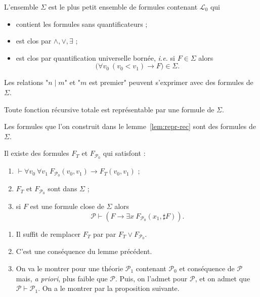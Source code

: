 \documentclass[./main]{subfiles}
\begin{document}
 \begin{defn}
   L'ensemble $\Sigma$ est le plus petit ensemble de formules contenant $\mathcal{L}_0$ qui 
   \begin{itemize}
     \item contient les formules sans quantificateurs ;
     \item est clos par $\land, \lor, \exists$ ;
     \item est clos par quantification universelle bornée, \textit{i.e.} si $F \in \Sigma$  alors \[
       \big(\forall v_0 \: (v_0 < v_1) \to F\big) \in \Sigma
       .\]
   \end{itemize}
 \end{defn}

 \begin{exm}
   Les relations "$n  \mid m$" et "$m$ est premier" peuvent s'exprimer avec des formules de $\Sigma$.
 \end{exm}

 \begin{lem}
   Toute fonction récursive totale est représentable par une formule de $\Sigma$.
 \end{lem}
 \begin{prv}
   Les formules que l'on construit dans le lemme~\ref{lem:repr-rec} sont des formules de $\Sigma$.
 \end{prv}

 \begin{lem}
   Il existe des formules $F_T$ et $F_{\mathcal{P}_0}$ qui satisfont :
   \begin{enumerate}
     \item $\vdash \forall v_0 \: \forall v_1 \: F_{\mathcal{P}_0}(v_0, v_1) \to F_T(v_0, v_1)$ ;
     \item $F_T$ et $F_{\mathcal{P}_0}$ sont dans $\Sigma$ ;
     \item si $F$ est une formule close de $\Sigma$ alors \[
       \mathcal{P} \vdash (F \to \exists x \: F_{\mathcal{P}_0} (x_1, \sharp F))
       .\]
   \end{enumerate}
 \end{lem}
 \begin{prv}
   \begin{enumerate}
     \item Il suffit de remplacer $F_T$ par par $F_T \lor F_{\mathcal{P}_0}$.
     \item C'est une conséquence du lemme précédent.
     \item On va le montrer pour une théorie $\mathcal{P}_1$ contenant $\mathcal{P}_0$ et conséquence de $\mathcal{P}$ mais, \textit{a priori}, plus faible que $\mathcal{P}$.
       Puis, on l'admet pour $\mathcal{P}$, et on admet que $\mathcal{P} \vdash \mathcal{P}_1$.
       On a le montrer par la proposition suivante.
   \end{enumerate}
 \end{prv}
\end{document}
